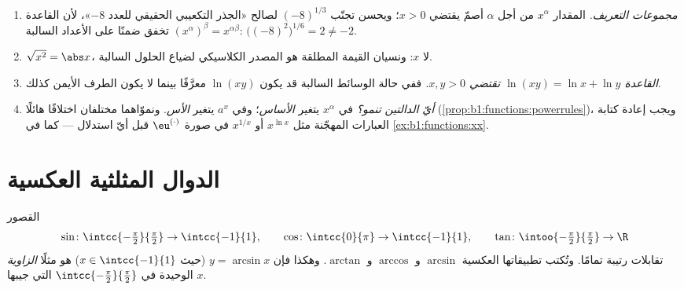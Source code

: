 \begin{remark}\label{rem:b1:functions:pitfalls}
\begin{enumerate}
  \item \emph{مجموعات التعريف.} المقدار $x^\alpha$ من أجل $\alpha$
        أصمّ يقتضي $x > 0$؛ ويحسن تجنّب $(-8)^{1/3}$ لصالح «الجذر
        التكعيبي الحقيقي للعدد $-8$»، لأن القاعدة
        $(x^\alpha)^\beta = x^{\alpha\beta}$ تخفق ضمنًا على
        الأعداد السالبة: $\bigl((-8)^2\bigr)^{1/6} = 2 \neq -2$.
  \item \emph{$\sqrt{x^2} = \abs x$}، لا $x$: ونسيان
        القيمة المطلقة هو المصدر الكلاسيكي لضياع الحلول السالبة.
  \item \emph{القاعدة $\ln(xy) = \ln x + \ln y$ تقتضي $x, y > 0$.} ففي حالة
        الوسائط السالبة قد يكون $\ln(xy)$ معرَّفًا بينما لا يكون
        الطرف الأيمن كذلك.
  \item \emph{أيّ الدالتين تنمو؟} في $x^\alpha$ يتغير
        \emph{الأساس}؛ وفي $a^x$ يتغير \emph{الأس}.
        ونموّاهما مختلفان اختلافًا هائلًا
        (\cref{prop:b1:functions:powerrules})، ويجب إعادة كتابة
        العبارات المهجّنة مثل $x^{\ln x}$ أو $x^{1/x}$ في صورة
        $\eu^{(\cdot)}$ قبل أيّ استدلال ---
        كما في \cref{ex:b1:functions:xx}.
\end{enumerate}
\end{remark}

\section{الدوال المثلثية العكسية}

\begin{definition}\label{def:b1:functions:arc}
القصور
\[
\sin \colon \intcc{-\tfrac\pi2}{\tfrac\pi2} \to \intcc{-1}{1},
\qquad
\cos \colon \intcc{0}{\pi} \to \intcc{-1}{1},
\qquad
\tan \colon \intoo{-\tfrac\pi2}{\tfrac\pi2} \to \R
\]
تقابلات رتيبة تمامًا. وتُكتب تطبيقاتها العكسية
$\arcsin$ و $\arccos$ و
$\arctan$. وهكذا فإن $y = \arcsin x$
(حيث $x \in \intcc{-1}{1}$) هو مثلًا \emph{الزاوية} الوحيدة في
$\intcc{-\frac\pi2}{\frac\pi2}$ التي جيبها $x$.
\end{definition}

